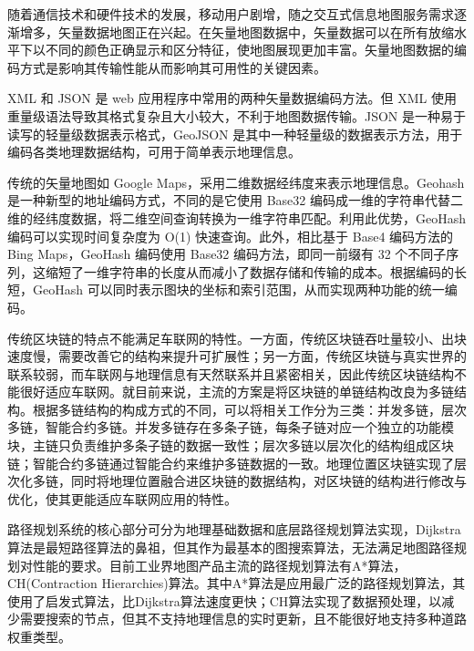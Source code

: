 随着通信技术和硬件技术的发展，移动用户剧增，随之交互式信息地图服务需求逐渐增多，矢量数据地图正在兴起。在矢量地图数据中，矢量数据可以在所有放缩水平下以不同的颜色正确显示和区分特征，使地图展现更加丰富。矢量地图数据的编码方式是影响其传输性能从而影响其可用性的关键因素。

XML 和 JSON 是 web 应用程序中常用的两种矢量数据编码方法。但 XML 使用重量级语法导致其格式复杂且大小较大，不利于地图数据传输。JSON 是一种易于读写的轻量级数据表示格式，GeoJSON 是其中一种轻量级的数据表示方法，用于编码各类地理数据结构，可用于简单表示地理信息。

传统的矢量地图如 Google Maps，采用二维数据经纬度来表示地理信息。Geohash 是一种新型的地址编码方式，不同的是它使用 Base32 编码成一维的字符串代替二维的经纬度数据，将二维空间查询转换为一维字符串匹配。利用此优势，GeoHash 编码可以实现时间复杂度为 O(1) 快速查询。此外，相比基于 Base4 编码方法的 Bing Maps，GeoHash 编码使用 Base32 编码方法，即同一前缀有 32 个不同子序列，这缩短了一维字符串的长度从而减小了数据存储和传输的成本。根据编码的长短，GeoHash 可以同时表示图块的坐标和索引范围，从而实现两种功能的统一编码。

传统区块链的特点不能满足车联网的特性。一方面，传统区块链吞吐量较小、出块速度慢，需要改善它的结构来提升可扩展性；另一方面，传统区块链与真实世界的联系较弱，而车联网与地理信息有天然联系并且紧密相关，因此传统区块链结构不能很好适应车联网。就目前来说，主流的方案是将区块链的单链结构改良为多链结构。根据多链结构的构成方式的不同，可以将相关工作分为三类：并发多链，层次多链，智能合约多链。并发多链存在多条子链，每条子链对应一个独立的功能模块，主链只负责维护多条子链的数据一致性；层次多链以层次化的结构组成区块链；智能合约多链通过智能合约来维护多链数据的一致。地理位置区块链实现了层次化多链，同时将地理位置融合进区块链的数据结构，对区块链的结构进行修改与优化，使其更能适应车联网应用的特性。

路径规划系统的核心部分可分为地理基础数据和底层路径规划算法实现，Dijkstra算法是最短路径算法的鼻祖，但其作为最基本的图搜索算法，无法满足地图路径规划对性能的要求。目前工业界地图产品主流的路径规划算法有A*算法，CH(Contraction Hierarchies)算法。其中A*算法是应用最广泛的路径规划算法，其使用了启发式算法，比Dijkstra算法速度更快；CH算法实现了数据预处理，以减少需要搜索的节点，但其不支持地理信息的实时更新，且不能很好地支持多种道路权重类型。

